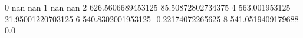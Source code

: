 0 nan nan
1 nan nan
2 626.5606689453125 85.50872802734375
4 563.001953125 21.95001220703125
6 540.8302001953125 -0.22174072265625
8 541.0519409179688 0.0

